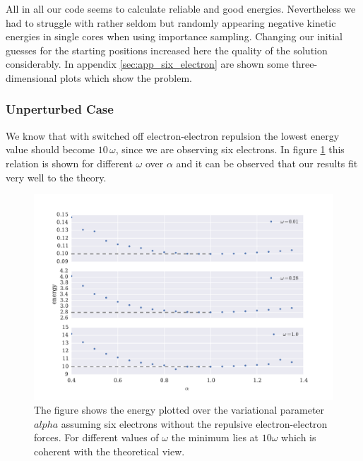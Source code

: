 All in all our code seems to calculate reliable and good energies. Nevertheless we had to struggle with rather seldom but randomly appearing negative kinetic energies in single cores when using importance sampling. Changing our initial guesses for the starting positions increased here the quality of the solution considerably. In appendix \ref{sec:app_six_electron} are shown some three-dimensional plots which show the problem. 

\subsubsection{Unperturbed Case}
We know that with switched off electron-electron repulsion the lowest energy value should become $10\,\omega$, since we are observing six electrons. In figure \ref{fig:six_electron_unperturbed} this relation is shown for different $\omega$ over $\alpha$ and it can be observed that our results fit very well to the theory. 
\begin{figure}[htbp]
    \centering
    \includegraphics[scale=0.7]{six_electron_unperturbed}
    \caption{The figure shows the energy plotted over the variational parameter $alpha$ assuming six electrons without the repulsive electron-electron forces. For different values of $\omega$ the minimum lies at $10\omega$ which is coherent with the theoretical view.}
    \label{fig:six_electron_unperturbed}
\end{figure}

